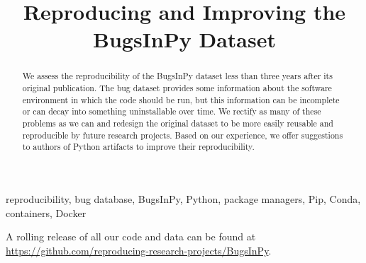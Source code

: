 \documentclass[conference]{IEEEtran}
\begin{document}
\title{Reproducing and Improving the BugsInPy Dataset}

\author{
\and  
{}
\and
{}
}

\maketitle

\begin{abstract}
  We assess the reproducibility of the BugsInPy dataset less than three years after its original publication.
  The bug dataset provides some information about the software environment in which the code should be run, but this information can be incomplete or can decay into something uninstallable over time.
  We rectify as many of these problems as we can and redesign the original dataset to be more easily reusable and reproducible by future research projects.
  Based on our experience, we offer suggestions to authors of Python artifacts to improve their reproducibility.
\end{abstract}

\begin{IEEEkeywords}
reproducibility, bug database, BugsInPy, Python, package managers, Pip, Conda, containers, Docker
\end{IEEEkeywords}




\printbibliography


A rolling release of all our code and data can be found at \url{https://github.com/reproducing-research-projects/BugsInPy}.
\end{document}
